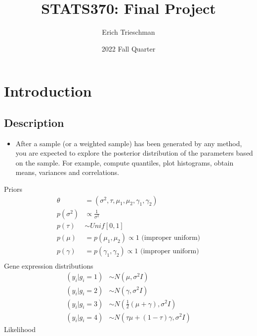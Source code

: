\documentclass{article}
\title{STATS370: Final Project}
\author{Erich Trieschman}
\date{2022 Fall Quarter}
\begin{document}
\maketitle


\section{Introduction}
\subsection{Description}
\begin{itemize}
  \item After a sample (or a weighted sample) has been generated by any method,  you are expected to explore the posterior distribution of the parameters based on the sample. For example, compute quantiles, plot histograms, obtain means, variances and correlations.
\end{itemize}
Priors
\begin{align*}
  \theta &= (\sigma^2, \tau, \mu_1, \mu_2, \gamma_1, \gamma_2)\\
  p(\sigma^2) &\propto \frac{1}{\sigma^2}\\
  p(\tau) &\sim Unif[0, 1]\\
  p(\mu) &= p(\mu_1, \mu_2) \propto 1 \textrm{ (improper uniform)}\\
  p(\gamma) &= p(\gamma_1, \gamma_2) \propto 1 \textrm{ (improper uniform)}\\
\end{align*}
Gene expression distributions
\begin{align*}
  (y_i | g_i = 1) &\sim N(\mu, \sigma^2 I)\\
  (y_i | g_i = 2) &\sim N(\gamma, \sigma^2 I)\\
  (y_i | g_i = 3) &\sim N(\frac{1}{2}(\mu + \gamma), \sigma^2 I)\\
  (y_i | g_i = 4) &\sim N(\tau\mu + (1-\tau)\gamma, \sigma^2 I)
\end{align*}
Likelihood
\end{document}
